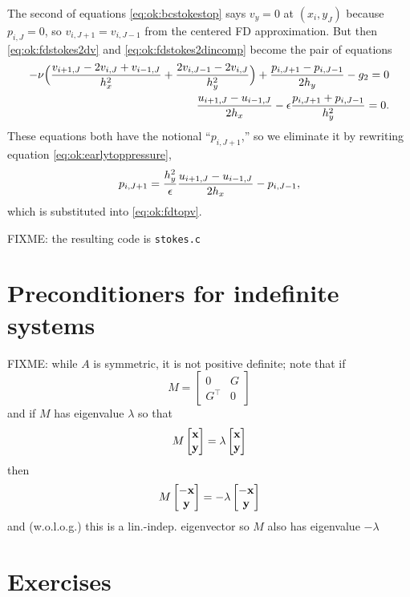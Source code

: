 The second of equations \eqref{eq:ok:bcstokestop} says $v_y=0$ at $(x_i,y_J)$ because $p_{i,J}=0$, so $v_{i,J+1} = v_{i,J-1}$ from the centered FD approximation.  But then \eqref{eq:ok:fdstokes2dv} and \eqref{eq:ok:fdstokes2dincomp} become the pair of equations
\begin{align}
-\nu \Big(\frac{v_{i+1,J} - 2 v_{i,J} + v_{i-1,J}}{h_x^2} + \frac{2 v_{i,J-1} - 2 v_{i,J}}{h_y^2}\Big) + \frac{p_{i,J+1}-p_{i,J-1}}{2h_y} - g_2 = 0 \label{eq:ok:fdtopv} \\
\frac{u_{i+1,J}-u_{i-1,J}}{2h_x}  - \epsilon \frac{p_{i,J+1} + p_{i,J-1}}{h_y^2} = 0. \label{eq:ok:earlytoppressure}
\end{align}
These equations both have the notional ``$p_{i,J+1}$,'' so we eliminate it by rewriting equation \eqref{eq:ok:earlytoppressure},
\begin{equation}
p_{i,J+1} = \frac{h_y^2}{\epsilon} \frac{u_{i+1,J}-u_{i-1,J}}{2h_x} - p_{i,J-1},\label{eq:ok:fdtoppressureelim}
\end{equation}
which is substituted into \eqref{eq:ok:fdtopv}.

FIXME: the resulting code is \texttt{stokes.c}


\section{Preconditioners for indefinite systems}

FIXME: while $A$ is symmetric, it is not positive definite; note that if
    $$M = \begin{bmatrix} 0 & G \\ G^\top & 0 \end{bmatrix}$$
and if $M$ has eigenvalue $\lambda$ so that
    $$M \begin{bmatrix} \mathbf{x} \\ \mathbf{y} \end{bmatrix} = \lambda \begin{bmatrix} \mathbf{x} \\ \mathbf{y} \end{bmatrix}$$
then
    $$M \begin{bmatrix} -\mathbf{x} \\ \mathbf{y} \end{bmatrix} = - \lambda \begin{bmatrix} -\mathbf{x} \\ \mathbf{y} \end{bmatrix}$$
and (w.o.l.o.g.) this is a lin.-indep. eigenvector so $M$ also has eigenvalue $-\lambda$


\section{Exercises}

